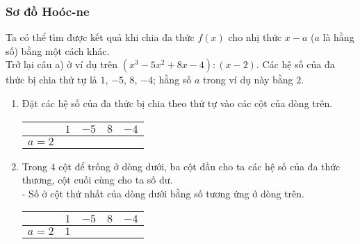 \subsubsection{Sơ đồ Hoóc-ne}
Ta có thể tìm được kết quả khi chia đa thức $f(x)$ cho nhị thức $x-a$ ($a$ là hằng số) bằng một cách khác.\\
Trở lại câu a) ở ví dụ trên $(x^3-5x^2+8x-4):(x-2)$. Các hệ số của đa thức bị chia thứ tự là $1$, $-5$, $8$, $-4$; hằng số $a$ trong ví dụ này bằng $2$.\\
\begin{enumerate}
\item  Đặt các hệ số của đa thức bị chia theo thứ tự vào các cột của dòng trên.
\begin{center}
	\begin{tabular}{c|c|c|c|c}
		&\hspace{1cm} $1$\hspace{1cm} & \hspace{1cm} $-5$\hspace{1cm}  &\hspace{1cm} $8$ \hspace{1cm}  & \hspace{1cm} $-4$ \hspace{1cm}  \\ 
		\hline 
		\hspace{0.5cm} $a=2$\hspace{0.5cm}	&  &  &  &
	\end{tabular} 
\end{center}
\item  Trong $4$ cột để trống ở dòng dưới, ba cột đầu cho ta các hệ số của đa thức thương, cột cuối cùng cho ta số dư.\\
- Số ở cột thứ nhất của dòng dưới bằng số tương ứng ở dòng trên.
\begin{center}
	\begin{tabular}{c|c|c|c|c}
		&\hspace{1cm} $1$\hspace{1cm} & \hspace{1cm} $-5$\hspace{1cm}  &\hspace{1cm} $8$ \hspace{1cm}  & \hspace{1cm} $-4$ \hspace{1cm}  \\ 
		\hline 
		\hspace{0.5cm} $a=2$\hspace{0.5cm}	&\hspace{1cm} $1$\hspace{1cm}  &  &  &

\end{tabular}
\end{center}
\end{enumerate}
